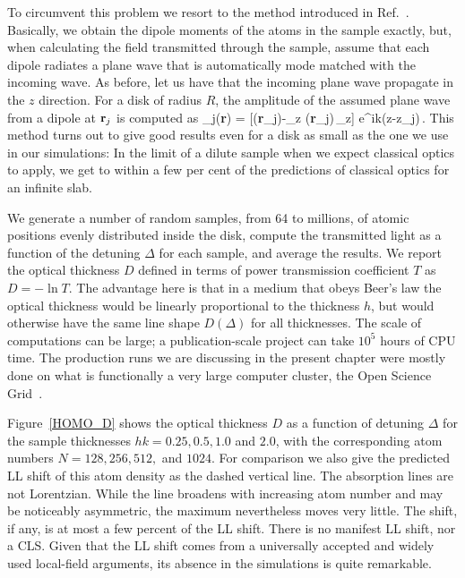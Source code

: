 To circumvent this problem we resort to the method introduced in Ref.~\cite{1367-2630-14-5-055001}. Basically, we obtain the dipole moments of the atoms in the sample exactly, but, when calculating the field transmitted through the sample, assume that each dipole radiates a plane wave that is automatically mode matched with the incoming wave. As before, let us have that the incoming plane wave propagate in the $z$ direction. For a disk of radius $R$, the amplitude of the assumed plane wave from a dipole at ${\bf r}_j$ is computed as
\beq
\bE_j({\bf r}) =  [\bd({\bf r}_j)-_z \cdot\bd({\bf r}_j)\,_z] e^{ik(z-z_j)}\,.
\label{TRLIGHT}
\eeq
This method turns out to give good results even for a disk as small as the one we use in our simulations: In the limit of a dilute sample when we expect classical optics to apply, we get to within a few per cent of the predictions of classical optics for an infinite slab.

We generate a number of random samples, from 64 to millions, of atomic positions evenly distributed inside the disk, compute the transmitted light as a function of the detuning $\Delta$ for each sample, and average the results. We report the optical thickness $D$ defined in terms of power transmission coefficient $T$ as $D=-\ln T$. The advantage here is that in a medium that obeys Beer's law the optical thickness would be linearly proportional to the thickness $h$, but would otherwise have the same line shape $D(\Delta)$ for all thicknesses. The scale of computations can be large; a publication-scale project can take $10^5$ hours of CPU time. The production runs we are discussing in the present chapter were mostly done on what is functionally a very large computer cluster, the Open Science Grid~\cite{OSG}.

Figure~\ref{HOMO_D} shows the optical thickness $D$ as a function of detuning $\Delta$ for the sample thicknesses $hk=0.25, 0.5, 1.0$ and $2.0$, with the corresponding atom numbers $N=128, 256, 512,$ and $1024$. For comparison we also give the predicted LL shift of this atom density as the dashed vertical line. The absorption lines are not Lorentzian. While the line broadens with increasing atom number and may be noticeably asymmetric, the maximum nevertheless moves very little. The shift, if any, is at most a few percent of the LL shift. There is no manifest LL shift, nor a CLS. Given that the LL shift comes from a universally accepted and widely used local-field arguments, its absence in the simulations is quite remarkable.



